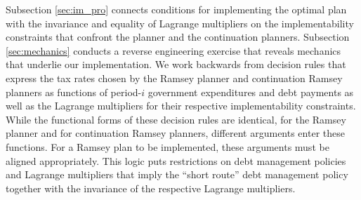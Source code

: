 \documentclass[12pt]{article}
\newcommand{\NW}[1]{{\textcolor{blue}{#1}}}
\newcommand{\TS}[1]{{\textcolor{magenta}{#1}}}
\begin{document}
{Subsection \ref{sec:im_pro}  connects conditions for implementing the optimal  plan with the invariance and equality  of   Lagrange multipliers on the  implementability constraints that confront the  planner and the continuation planners.}   Subsection \ref{sec:mechanics} conducts a reverse engineering exercise that reveals  mechanics that underlie our implementation. %
{We work backwards from decision rules that express the tax rates chosen by the  Ramsey planner and continuation Ramsey planners as functions of period-$i$ government expenditures and debt payments as well as the  Lagrange multipliers for  their respective implementability constraints. While the functional forms of these decision rules are identical, for the Ramsey planner and for continuation Ramsey planners, different arguments  enter these functions. For a Ramsey plan to be implemented, these arguments must be  aligned appropriately.  This logic puts restrictions on debt management policies and Lagrange multipliers that imply the  ``short route'' debt management policy together with  the invariance of the respective Lagrange multipliers. }
\end{document}
